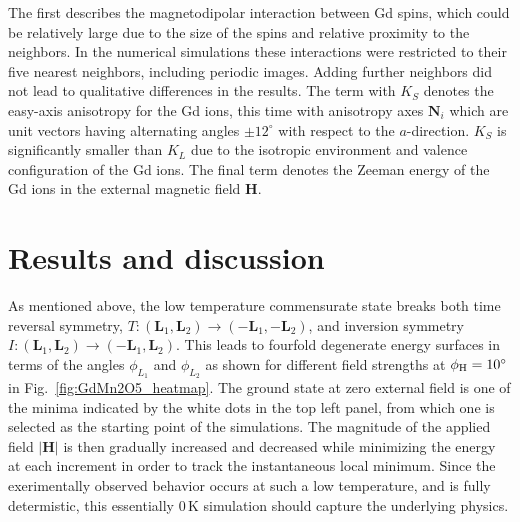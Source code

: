 The first describes the magnetodipolar interaction between Gd spins, which could be relatively large due to the size of the spins and relative proximity to the neighbors. In the numerical simulations these interactions were restricted to their five nearest neighbors, including periodic images. Adding further neighbors did not lead to qualitative differences in the results. The term with $K_S$ denotes the easy-axis anisotropy for the Gd ions, this time with anisotropy axes $\mathbf{N}_i$ which are unit vectors having alternating angles $\pm 12^\circ$ with respect to the $a$-direction. $K_S$ is significantly smaller than $K_L$ due to the isotropic environment and valence configuration of the Gd ions.
The final term denotes the Zeeman energy of the Gd ions in the external magnetic field $\mathbf{H}$.


\section{Results and discussion}

As mentioned above, the low temperature commensurate state breaks both time reversal symmetry, $T: (\mathbf{L}_1, \mathbf{L}_2) \rightarrow (-\mathbf{L}_1, -\mathbf{L}_2)$, and inversion symmetry $I:(\mathbf{L}_1, \mathbf{L}_2) \rightarrow (-\mathbf{L}_1, \mathbf{L}_2)$.
This leads to fourfold degenerate energy surfaces in terms of the angles $\phi_{L_1}$ and $\phi_{L_2}$ as shown for different field strengths at $\phi_{\rm H} = 10^\circ$ in Fig.~\ref{fig:GdMn2O5_heatmap}.
The ground state at zero external field is one of the minima indicated by the white dots in the top left panel, from which one is selected as the starting point of the simulations.
The magnitude of the applied field $|\bm{H}|$ is then gradually increased and decreased while minimizing the energy at each increment in order to track the instantaneous local minimum.
Since the exerimentally observed behavior occurs at such a low temperature, and is fully determistic, this essentially 0\,K simulation should capture the underlying physics.


